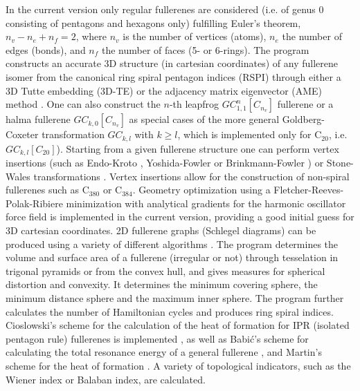 \documentclass[article,a4paper,twoside]{memoir}
\newcommand{\C}[1]{\ensuremath{\mathrm{C}_{#1}}}
\begin{document}
In the current version only regular fullerenes are considered (i.e. of genus 0 consisting of pentagons and hexagons only) 
fulfilling Euler's theorem, $n_v - n_e + n_f = 2$, where $n_v$ is the number of vertices (atoms), $n_e$ the number of edges (bonds), and 
$n_f$ the number of faces (5- or 6-rings). The program constructs an accurate 3D structure (in cartesian coordinates) of any fullerene isomer 
from the canonical ring spiral pentagon indices (RSPI) through either a 3D Tutte embedding (3D-TE) \cite{Tutte} or the adjacency matrix
eigenvector (AME) method \cite{Atlas}. One can also construct the $n$-th leapfrog $GC_{1,1}^n[C_{n_v}]$ fullerene or a halma fullerene 
$GC_{k,0}[C_{n_v}]$ as special cases of the more general Goldberg-Coxeter transformation $GC_{k,l}$ with $k \geq l$, which is implemented
only for \C{20}, i.e. $GC_{k,l}[C_{20}]$). Starting from a given fullerene structure one can 
perform vertex insertions (such as Endo-Kroto \cite{Endo92}, Yoshida-Fowler \cite{Yoshida97} or Brinkmann-Fowler \cite{BrinkmannFowler03})
or Stone-Wales transformations \cite{Stone86}. 
Vertex insertions allow for the construction of non-spiral fullerenes such as \C{380} or \C{384}. 
Geometry optimization using a Fletcher-Reeves-Polak-Ribiere
minimization \cite{NumRec} with analytical gradients for the harmonic oscillator force field \cite{Wu87} is implemented in the current version, providing 
a good initial guess for 3D cartesian coordinates. 2D fullerene graphs (Schlegel diagrams)
can be produced using a variety of different algorithms \cite{Plestenjak}. The program determines the volume and surface area 
of a fullerene (irregular or not) through tesselation in trigonal pyramids or from the convex hull, and gives measures for
spherical distortion and convexity. It determines the minimum covering sphere, the minimum distance sphere
and the maximum inner sphere. The program further calculates the number of Hamiltonian cycles
and produces ring spiral indices. Cioslowski's scheme for the calculation of the heat of formation for IPR
(isolated pentagon rule) fullerenes is implemented \cite{Cioslowski2000}, as well as Babi{\'c}'s scheme for calculating the 
total resonance energy of a general fullerene \cite{Babic1995,Babic1997}, and Martin's scheme for the heat of formation \cite{Alcami}.
A variety of topological indicators, such as the Wiener index or Balaban index, are calculated.\cite{Wiener1947,Balaban}
\end{document}

